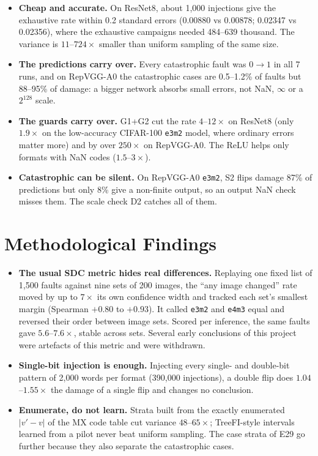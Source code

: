 \documentclass[12pt,a4paper]{article}
\newcommand{\fmt}[1]{\texttt{#1}}
\begin{document}
\begin{itemize}
    \item \textbf{Cheap and accurate.} On ResNet8, about 1,000 injections give the exhaustive
          rate within 0.2 standard errors (0.00880 vs 0.00878; 0.02347 vs 0.02356), where the
          exhaustive campaigns needed 484--639 thousand. The variance is $11$--$724\times$
          smaller than uniform sampling of the same size.
    \item \textbf{The predictions carry over.} Every catastrophic fault was $0\to1$ in all 7
          runs, and on RepVGG-A0 the catastrophic cases are 0.5--1.2\% of faults but 88--95\% of
          damage: a bigger network absorbs small errors, not NaN, $\infty$ or a $2^{128}$ scale.
    \item \textbf{The guards carry over.} G1+G2 cut the rate $4$--$12\times$ on ResNet8 (only
          $1.9\times$ on the low-accuracy CIFAR-100 \fmt{e3m2} model, where ordinary errors
          matter more) and by over $250\times$ on RepVGG-A0. The ReLU helps only formats with
          NaN codes ($1.5$--$3\times$).
    \item \textbf{Catastrophic can be silent.} On RepVGG-A0 \fmt{e3m2}, S2 flips damage 87\% of
          predictions but only 8\% give a non-finite output, so an output NaN check misses
          them. The scale check D2 catches all of them.
\end{itemize}

\section{Methodological Findings}
\label{sec:metric}

\begin{itemize}
    \item \textbf{The usual SDC metric hides real differences.} Replaying one fixed list of
          1,500 faults against nine sets of 200 images, the ``any image changed'' rate moved by
          up to $7\times$ its own confidence width and tracked each set's smallest margin
          (Spearman $+0.80$ to $+0.93$). It called \fmt{e3m2} and \fmt{e4m3} equal and reversed
          their order between image sets. Scored per inference, the same faults gave
          $5.6$--$7.6\times$, stable across sets. Several early conclusions of this project were
          artefacts of this metric and were withdrawn.
    \item \textbf{Single-bit injection is enough.} Injecting every single- and double-bit
          pattern of 2,000 words per format (390,000 injections), a double flip does
          $1.04$--$1.55\times$ the damage of a single flip and changes no conclusion.
    \item \textbf{Enumerate, do not learn.} Strata built from the exactly enumerated $|v'-v|$
          of the MX code table cut variance $48$--$65\times$; TreeFI-style intervals learned
          from a pilot never beat uniform sampling. The case strata of E29 go further because
          they also separate the catastrophic cases.
\end{itemize}
\end{document}
